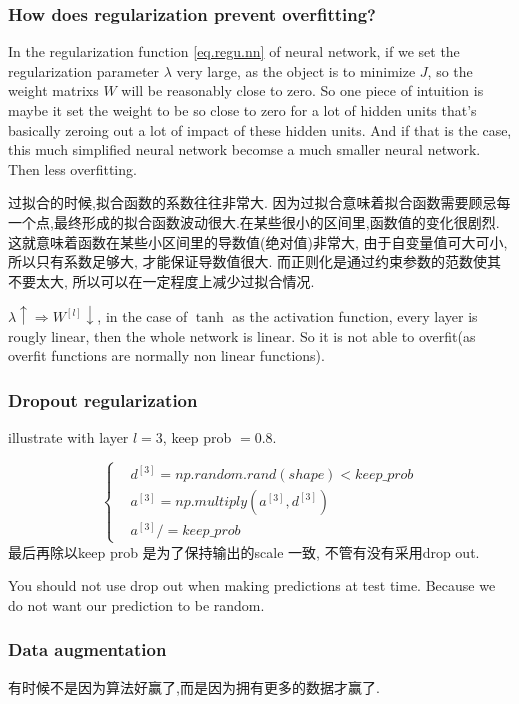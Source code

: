 \subsubsection{How does regularization prevent overfitting?}
In the regularization function \eqref{eq.regu.nn} of neural network, if we set the regularization parameter $\lambda$ very large, as the object is to minimize $J$, so the weight matrixs $W$ will be reasonably close to zero.
So one piece of intuition is maybe it set the weight to be so close to zero for a lot of hidden units that's basically zeroing out a lot of impact of these hidden units.
And if that is the case, this much simplified neural network becomse a much smaller neural network. Then less overfitting.

过拟合的时候,拟合函数的系数往往非常大.
因为过拟合意味着拟合函数需要顾忌每一个点,最终形成的拟合函数波动很大.在某些很小的区间里,函数值的变化很剧烈.
这就意味着函数在某些小区间里的导数值(绝对值)非常大, 由于自变量值可大可小, 所以只有系数足够大, 才能保证导数值很大.
而正则化是通过约束参数的范数使其不要太大, 所以可以在一定程度上减少过拟合情况.

$\lambda \uparrow \Longrightarrow W^{[l]} \downarrow$, in the case of $\tanh$ as the activation function, every layer is rougly linear, then the whole network is linear.
So it is not able to overfit(as overfit functions are normally non linear functions).

\subsubsection{Dropout regularization}
illustrate with layer $l = 3$, keep prob $= 0.8$.

$$
\left\{
\begin{aligned}
& d^{[3]} = np.random.rand(shape) < keep\_prob \\
& a^{[3]} = np.multiply(a^{[3]}, d^{[3]}) \\
& a^{[3]} /= keep\_prob
\end{aligned}
\right.
$$
最后再除以keep prob 是为了保持输出的scale 一致, 不管有没有采用drop out.

You should not use drop out when making predictions at test time. Because we do not want our prediction to be random.

\subsubsection{Data augmentation}
有时候不是因为算法好赢了,而是因为拥有更多的数据才赢了.

